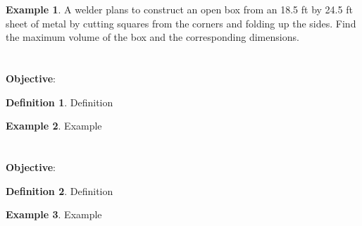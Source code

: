 \documentclass{report}
\theoremstyle{definition}
\newtheorem{example}{\bf Example}
\newtheorem{definition}{\bf Definition}[section]
\begin{document}
\vfill

\begin{example}
A welder plans to construct an open box from an 18.5 ft by 24.5 ft sheet of metal by cutting squares from the corners and folding up the sides. Find the maximum volume of the box and the corresponding dimensions.
\end{example}


\vfill

 \noindent{}

 \newpage

 \section{   }
 \indent\hfill\small\noindent \textbf{Objective}:  \normalsize\\
 \setcounter{example}{0}
 \setcounter{definition}{0}
 \begin{definition}
     Definition
 \end{definition}
 \begin{example}
     Example
 \end{example}

\vfill
 \noindent{}
 \newpage

 \section{   }
 \indent\hfill\small\noindent \textbf{Objective}: \normalsize\\
 \setcounter{example}{0}
 \setcounter{definition}{0}
 \begin{definition}
     Definition
 \end{definition}
 \begin{example}
     Example
 \end{example}

\vfill
 \noindent{}
 \newpage
\end{document}
